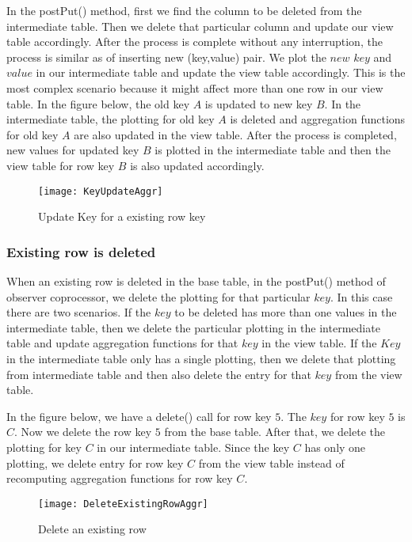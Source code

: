 \documentclass[11pt,a4paper,bibtotoc,idxtotoc,headsepline,footsepline,footexclude,BCOR12mm,DIV13]{scrbook}
\begin{document}
In the postPut() method, first we find the column to be deleted from the intermediate table. Then we delete that particular column and update our view table accordingly. After the process is complete without any interruption, the process is similar as of inserting new (key,value) pair. We plot the $new$ $key$ and $value$ in our intermediate table and update the view table accordingly. This is the most complex scenario because it might affect more than one row in our view table. In the figure below, the old key $A$ is updated to new key $B$. In the intermediate table, the plotting for old key $A$ is deleted and aggregation functions for old key $A$ are also updated in the view table. After the process is completed, new values for updated key $B$ is plotted in the intermediate table and then the view table for row key $B$ is also updated accordingly.

\begin{figure}
	\centering
	\texttt{[image: KeyUpdateAggr]}
	\caption{Update Key for a existing row key}
	\label{sec:updateKeyforexistingrow}
	
\end{figure} 

\newpage
\subsubsection{Existing row is deleted}
When an existing row is deleted in the base table, in the postPut() method of observer coprocessor, we delete the plotting for that particular $key$. In this case there are two scenarios. If the $key$ to be deleted has more than one values in the intermediate table, then we delete the particular plotting in the intermediate table and update aggregation functions for that $key$ in the view table. If the $Key$ in the intermediate table only has a single plotting, then we delete that plotting from intermediate table and then also delete the entry for that $key$ from the view table.

In the figure below, we have a delete() call for row key $5$. The $key$ for row key $5$ is $C$. Now we delete the row key $5$ from the base table. After that, we delete the plotting for key $C$ in our intermediate table. Since the key $C$ has only one plotting, we delete entry for row key $C$ from the view table instead of recomputing aggregation functions for row key $C$. 

\begin{figure}
	\centering
	\texttt{[image: DeleteExistingRowAggr]}
	\caption{Delete an existing row}
	\label{sec:deleteexistingrow}
	
\end{figure} 
\end{document}
